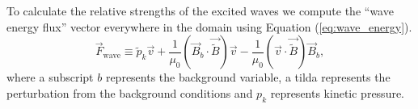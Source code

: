 %	
%	

To calculate the relative strengths of the excited waves we compute the ``wave energy flux'' vector everywhere in the domain using Equation (\ref{eq:wave_energy}).
\begin{equation}
	\vec{F}_{\text{wave}} \equiv \widetilde{p}_k \vec{v} + \frac{1}{\mu_0} \left(\vec{B}_b \cdot \vec{\widetilde{B}}\right) \vec{v} - \frac{1}{\mu_0}\left(\vec{v} \cdot \vec{\widetilde{B}} \right) \vec{B}_b,
	\label{eq:wave_energy}
\end{equation}
where a subscript $b$ represents the background variable, a tilda represents the perturbation from the background conditions and $p_k$ represents kinetic pressure.

